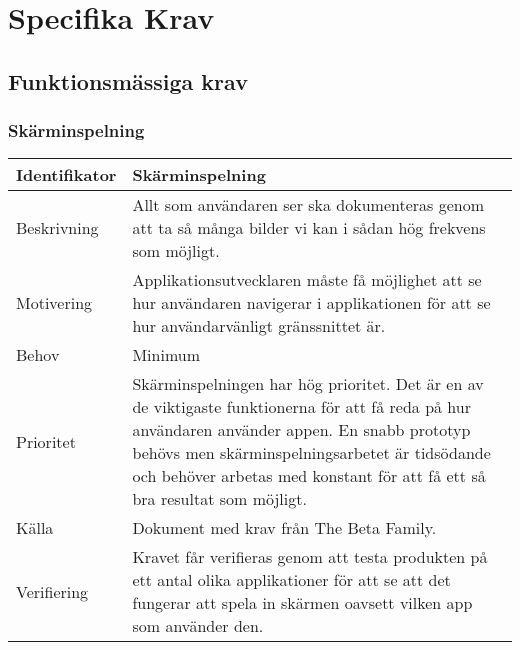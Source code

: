 \section{Specifika Krav}

\subsection{Funktionsmässiga krav}
\label{subsec:funcreq}

\subsubsection{Skärminspelning}
\begin{tabular}{ | p{65pt} | p{300pt} |}
  \hline
  Identifikator &
Skärminspelning
\\ \hline
  Beskrivning & 
Allt som användaren ser ska dokumenteras genom att ta så många bilder vi kan i sådan hög frekvens som möjligt.
  \\ \hline
  Motivering &
Applikationsutvecklaren måste få möjlighet att se hur användaren navigerar i applikationen för att se hur användarvänligt gränssnittet är.
  \\ \hline
  Behov &
Minimum
  \\ \hline
  Prioritet &  
Skärminspelningen har hög prioritet. Det är en av de viktigaste funktionerna för att få reda på hur användaren använder appen. En snabb prototyp behövs men skärminspelningsarbetet är tidsödande och behöver arbetas med konstant för att få ett så bra resultat som möjligt.
  \\ \hline
  Källa &
Dokument med krav från The Beta Family.
  \\ \hline
  Verifiering &
Kravet får verifieras genom att testa produkten på ett antal olika applikationer för att se att det fungerar att spela in skärmen oavsett vilken app som använder den.
  \\ \hline
\end{tabular}

